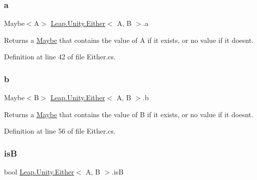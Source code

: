 \subsubsection{\texorpdfstring{a}{a}}
{\footnotesize\ttfamily Maybe$<$A$>$ \mbox{\hyperlink{struct_leap_1_1_unity_1_1_either}{Leap.\+Unity.\+Either}}$<$ A, B $>$.a\hspace{0.3cm}{\ttfamily [get]}}



Returns a \mbox{\hyperlink{struct_leap_1_1_unity_1_1_maybe}{Maybe}} that contains the value of A if it exists, or no value if it doesn\textquotesingle{}t. 



Definition at line 42 of file Either.\+cs.

\mbox{\label{struct_leap_1_1_unity_1_1_either_aaa579850040ea7c13ab798269e23fd0c}} 
\subsubsection{\texorpdfstring{b}{b}}
{\footnotesize\ttfamily Maybe$<$B$>$ \mbox{\hyperlink{struct_leap_1_1_unity_1_1_either}{Leap.\+Unity.\+Either}}$<$ A, B $>$.b\hspace{0.3cm}{\ttfamily [get]}}



Returns a \mbox{\hyperlink{struct_leap_1_1_unity_1_1_maybe}{Maybe}} that contains the value of B if it exists, or no value if it doesn\textquotesingle{}t. 



Definition at line 56 of file Either.\+cs.

\mbox{\label{struct_leap_1_1_unity_1_1_either_a66c31b6f54097c6a442888bad3aa8b01}} 
\subsubsection{\texorpdfstring{isB}{isB}}
{\footnotesize\ttfamily bool \mbox{\hyperlink{struct_leap_1_1_unity_1_1_either}{Leap.\+Unity.\+Either}}$<$ A, B $>$.isB\hspace{0.3cm}{\ttfamily [get]}}



